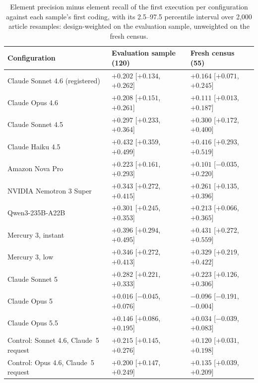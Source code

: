 \begin{table}[htbp]
\centering\footnotesize
\setlength{\tabcolsep}{4pt}
\begin{threeparttable}
\caption[Precision minus recall per configuration]{Element precision minus element recall of the first execution per configuration against each sample's first coding, with its 2.5--97.5 percentile interval over 2{,}000 article resamples: design-weighted on the evaluation sample, unweighted on the fresh census.}\label{tab:pr_gaps}
\begin{tabular}{@{}>{\raggedright\arraybackslash}p{50mm}>{\raggedright\arraybackslash}p{42mm}>{\raggedright\arraybackslash}p{42mm}@{}}
\toprule
\textbf{Configuration} & \textbf{Evaluation sample (120)} & \textbf{Fresh census (55)} \\
\midrule
Claude Sonnet 4.6 (registered) & $+0.202$ [$+0.134$, $+0.262$] & $+0.164$ [$+0.071$, $+0.245$] \\
Claude Opus 4.6 & $+0.208$ [$+0.151$, $+0.261$] & $+0.111$ [$+0.013$, $+0.187$] \\
Claude Sonnet 4.5 & $+0.297$ [$+0.233$, $+0.364$] & $+0.300$ [$+0.172$, $+0.400$] \\
Claude Haiku 4.5 & $+0.432$ [$+0.359$, $+0.499$] & $+0.416$ [$+0.293$, $+0.519$] \\
Amazon Nova Pro & $+0.223$ [$+0.161$, $+0.293$] & $+0.101$ [$-0.035$, $+0.220$] \\
NVIDIA Nemotron 3 Super & $+0.343$ [$+0.272$, $+0.415$] & $+0.261$ [$+0.135$, $+0.396$] \\
Qwen3-235B-A22B & $+0.301$ [$+0.245$, $+0.353$] & $+0.213$ [$+0.066$, $+0.365$] \\
Mercury 3, instant & $+0.396$ [$+0.294$, $+0.495$] & $+0.431$ [$+0.272$, $+0.559$] \\
Mercury 3, low & $+0.346$ [$+0.272$, $+0.413$] & $+0.329$ [$+0.219$, $+0.422$] \\
Claude Sonnet 5 & $+0.282$ [$+0.221$, $+0.333$] & $+0.223$ [$+0.126$, $+0.306$] \\
Claude Opus 5 & $+0.016$ [$-0.045$, $+0.076$] & $-0.096$ [$-0.191$, $-0.004$] \\
Claude Opus 5.5 & $+0.146$ [$+0.086$, $+0.195$] & $+0.034$ [$-0.039$, $+0.083$] \\
\addlinespace
Control: Sonnet 4.6, Claude~5 request & $+0.215$ [$+0.145$, $+0.276$] & $+0.120$ [$+0.031$, $+0.198$] \\
Control: Opus 4.6, Claude~5 request & $+0.200$ [$+0.147$, $+0.249$] & $+0.135$ [$+0.039$, $+0.209$] \\

\end{tabular}
\end{threeparttable}
\end{table}
